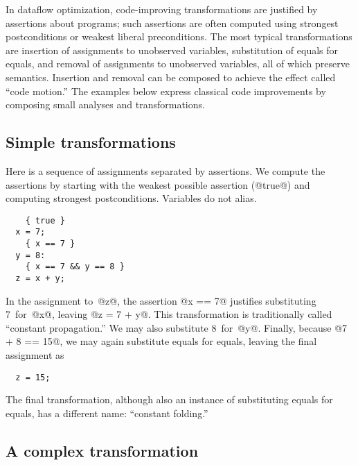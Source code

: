 \documentclass[blockstyle,preprint,natbib,nocopyrightspace]{sigplanconf}
\newcommand\naive{na\"\i ve}
\newcommand\delendum[1]{\unskip\relax}
\newcommand\seclabel[1]{\label{sec:#1}}
\begin{document}
\seclabel{example:transforms}
\seclabel{example:xforms}

In dataflow optimization, code-improving transformations are justified
by assertions about programs;
such assertions are often computed using
strongest postconditions or weakest liberal preconditions.
The most typical transformations are
insertion of assignments to unobserved variables,
substitution of equals for equals, 
and
removal of assignments to unobserved variables,
all of which preserve semantics.
Insertion and removal can be composed to achieve the effect called
``code motion.''
The examples below express classical code
improvements by composing small analyses and transformations.



\ifpagetuning \enlargethispage{1\baselineskip} \fi 

\subsection{Simple transformations}

\seclabel{constant-propagation}

Here is a sequence of assignments separated by assertions.
We compute the assertions by starting with the weakest possible
assertion (@true@) and computing strongest postconditions.
{Variables do not alias.}
\begin{verbatim}
    { true }
  x = 7;
    { x == 7 }
  y = 8: 
    { x == 7 && y == 8 }
  z = x + y;
\end{verbatim}
\delendum{SLPJ asks: Could we add $x=7,y=8,z=15$ as a final assertion?
We can but we should not, because a \naive\ sp function 
would produce the assertion $x=7\land y = 8
\land z = x+y$. To reach the point you desire, some sort of simplifier
would be required, and it is better to let the conclusion emerge
naturally as  the code is rewritten.}
In the assignment to~@z@, the assertion @x == 7@ justifies
substituting 7~for~@x@, leaving @z = 7 + y@.  
This transformation is traditionally called ``constant propagation.''
We may also substitute 8~for~@y@.
Finally, because @7 + 8 == 15@, we may again substitute equals for
equals, leaving the final assignment as
\begin{verbatim}
  z = 15;
\end{verbatim}
The final transformation, although also an instance of substituting equals
for equals, has a different name: ``constant folding.''

\subsection{A complex transformation}
\end{document}
